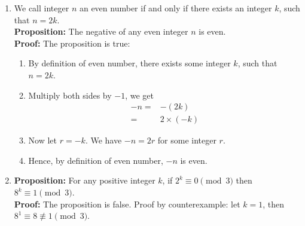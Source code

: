 \documentclass[11pt, preview]{standalone} %
\begin{document}
\begin{enumerate}
\item We call integer $n$ an even number if and only if there exists an integer $k$, such that $n = 2k$.\\
{\bf Proposition:} The negative of any even integer $n$ is even.\\
\textbf{Proof:} The proposition is true:
\begin{enumerate}[(1)]
\item By definition of even number, there exists some integer $k$, such that $n = 2k$.
\item Multiply both sides by $-1$, we get
  \begin{align*}
    -n =& -(2k)\\
    =& 2 \times (-k)
  \end{align*}
\item Now let $r = -k$. We have $-n = 2r$ for some integer $r$.
\item Hence, by definition of even number, $-n$ is even. 
\end{enumerate}
\begin{enumerate}
\end{enumerate}
\item {\bf Proposition:} For any positive integer $k$, if $2^k \equiv 0 \pmod{3}$ then $8^k \equiv 1 \pmod{3}$.\\
\textbf{Proof:} The proposition is false. Proof by counterexample: let $k = 1$, then $8^1 \equiv 8 \not \equiv 1 \pmod{3}$.
\begin{enumerate}
\end{enumerate}
\end{enumerate}
\end{document}
